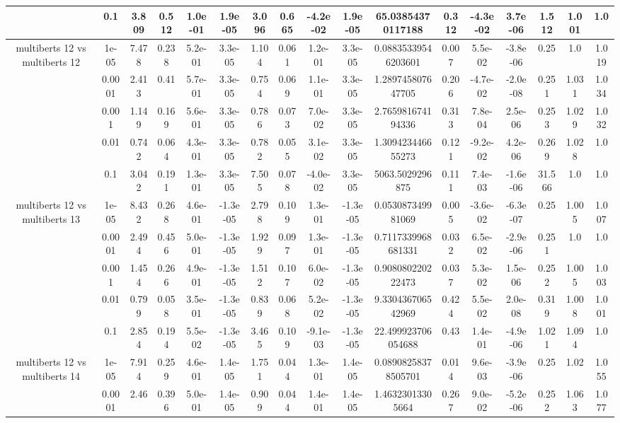 \begin{tabular}{|c|c|c|c|c|c|c|c|c|c|c|c|c|c|c|c|c|}
 & 0.1 & 3.809 & 0.512 & 1.0e-01 & 1.9e-05 & 3.096 & 0.665 & -4.2e-02 & 1.9e-05 & 65.03854370117188 & 0.312 & -4.3e-02 & 3.7e-06 & 1.512 & 1.001 & 1.0 \\
\hline
\multirow{5}{*}{multiberts 12 vs multiberts 12} & 1e-05 & 7.478 & 0.238 & 5.2e-01 & 3.3e-05 & 1.104 & 0.061 & 1.2e-01 & 3.3e-05 & 0.08835339546203601 & 0.007 & 5.5e-02 & -3.8e-06 & 0.25 & 1.0 & 1.019 \\
 & 0.0001 & 2.413 & 0.41 & 5.7e-01 & 3.3e-05 & 0.754 & 0.069 & 1.1e-01 & 3.3e-05 & 1.289745807647705 & 0.206 & -4.7e-02 & -2.0e-08 & 0.251 & 1.031 & 1.034 \\
 & 0.001 & 1.149 & 0.169 & 5.6e-01 & 3.3e-05 & 0.786 & 0.073 & 7.0e-02 & 3.3e-05 & 2.765981674194336 & 0.313 & 7.8e-04 & 2.5e-06 & 0.253 & 1.029 & 1.032 \\
 & 0.01 & 0.742 & 0.064 & 4.3e-01 & 3.3e-05 & 0.782 & 0.055 & 3.1e-02 & 3.3e-05 & 1.309423446655273 & 0.121 & -9.2e-02 & 4.2e-06 & 0.269 & 1.028 & 1.0 \\
 & 0.1 & 3.042 & 0.191 & 1.3e-01 & 3.3e-05 & 7.505 & 0.078 & -4.0e-02 & 3.3e-05 & 5063.5029296875 & 0.111 & 7.4e-03 & -1.6e-06 & 31.566 & 1.0 & 1.0 \\
\hline
\multirow{5}{*}{multiberts 12 vs multiberts 13} & 1e-05 & 8.432 & 0.268 & 4.6e-01 & -1.3e-05 & 2.798 & 0.109 & 1.3e-01 & -1.3e-05 & 0.053087349981069 & 0.005 & -3.6e-02 & -6.3e-07 & 0.25 & 1.005 & 1.007 \\
 & 0.0001 & 2.494 & 0.456 & 5.0e-01 & -1.3e-05 & 1.929 & 0.097 & 1.3e-01 & -1.3e-05 & 0.7117339968681331 & 0.032 & 6.5e-02 & -2.9e-06 & 0.251 & 1.0 & 1.0 \\
 & 0.001 & 1.454 & 0.266 & 4.9e-01 & -1.3e-05 & 1.512 & 0.107 & 6.0e-02 & -1.3e-05 & 0.908080220222473 & 0.037 & 5.3e-02 & 1.5e-06 & 0.252 & 1.005 & 1.003 \\
 & 0.01 & 0.799 & 0.058 & 3.5e-01 & -1.3e-05 & 0.839 & 0.068 & 5.2e-02 & -1.3e-05 & 9.330436706542969 & 0.424 & 5.5e-02 & 2.0e-08 & 0.319 & 1.008 & 1.001 \\
 & 0.1 & 2.854 & 0.194 & 5.5e-02 & -1.3e-05 & 3.465 & 0.109 & -9.1e-03 & -1.3e-05 & 22.499923706054688 & 0.43 & 1.4e-01 & -4.9e-06 & 1.021 & 1.094 & 1.0 \\
\hline
\multirow{5}{*}{multiberts 12 vs multiberts 14} & 1e-05 & 7.914 & 0.259 & 4.6e-01 & 1.4e-05 & 1.751 & 0.044 & 1.3e-01 & 1.4e-05 & 0.08908258378505701 & 0.014 & 9.6e-03 & -3.9e-06 & 0.25 & 1.02 & 1.055 \\
 & 0.0001 & 2.46 & 0.396 & 5.0e-01 & 1.4e-05 & 0.909 & 0.044 & 1.4e-01 & 1.4e-05 & 1.46323013305664 & 0.267 & 9.0e-02 & -5.2e-06 & 0.252 & 1.063 & 1.077 \\

\end{tabular}
